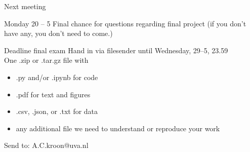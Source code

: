 \documentclass{beamer}
\begin{document}
\begin{frame}{Next meeting}
\begin{block}{Monday 20 -- 5}
	Final chance for questions regarding final project (if you don't have any, you don't need to come.)
\end{block}

\begin{block}{Deadline final exam}
Hand in via filesender until Wednesday, 29–5, 23.59 \\
One .zip or .tar.gz file with
\begin{itemize}
	\item .py and/or .ipynb for code
	\item .pdf for text and figures
	\item .csv, .json, or .txt for data
	\item any additional file we need to understand or reproduce your work
\end{itemize}
\end{block}
Send to: A.C.kroon@uva.nl
\end{frame}
\end{document}
